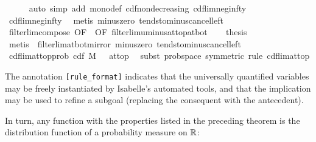 \documentclass[leqno]{article}
\theoremstyle{definition}
\begin{document}
\begin{isabellebody}
\ \ \ \ \isamarkupfalse%
\ {\isacharparenleft}auto\ simp\ add{\isacharcolon}\ mono{\isacharunderscore}def\ cdf{\isacharunderscore}nondecreasing\ cdf{\isacharunderscore}lim{\isacharunderscore}neg{\isacharunderscore}infty{\isacharparenright}\isanewline
\ \ \ \ \isamarkupfalse%
\ cdf{\isacharunderscore}lim{\isacharunderscore}neg{\isacharunderscore}infty\ \isamarkupfalse%
\ {\isacharparenleft}metis\ minus{\isacharunderscore}zero\ tendsto{\isacharunderscore}minus{\isacharunderscore}cancel{\isacharunderscore}left{\isacharparenright}\isanewline
\ \ \isamarkupfalse%
\ filterlim{\isacharunderscore}compose\ {\isacharbrackleft}OF\ {}{\isacharcomma}\ OF\ filterlim{\isacharunderscore}uminus{\isacharunderscore}at{\isacharunderscore}top{\isacharunderscore}at{\isacharunderscore}bot{\isacharbrackright}\isanewline
\ \ \isamarkupfalse%
\ {\isacharquery}thesis\isanewline
\ \ \ \ \isamarkupfalse%
\ {\isacharparenleft}metis\ {\isachardoublequoteopen}{}{\isachardoublequoteclose}\ filterlim{\isacharunderscore}at{\isacharunderscore}bot{\isacharunderscore}mirror\ minus{\isacharunderscore}zero\ tendsto{\isacharunderscore}minus{\isacharunderscore}cancel{\isacharunderscore}left{\isacharparenright}\isanewline
{}\isamarkupfalse%
\isanewline\isanewline%
\isamarkupfalse%
\ cdf{\isacharunderscore}lim{\isacharunderscore}at{\isacharunderscore}top{\isacharunderscore}prob{\isacharcolon}\ {\isachardoublequoteopen}{\isacharparenleft}cdf\ M\ {\isacharminus}{\isacharminus}{\isacharminus}{\isachargreater}\ {}{\isacharparenright}\ at{\isacharunderscore}top{\isachardoublequoteclose}\ \isanewline
{}\isamarkupfalse%
\ {\isacharparenleft}subst\ prob{\isacharunderscore}space\ {\isacharbrackleft}symmetric{\isacharbrackright}{\isacharcomma}\ rule\ cdf{\isacharunderscore}lim{\isacharunderscore}at{\isacharunderscore}top{\isacharparenright}%
\end{isabellebody}

\medskip

The annotation \texttt{[rule\_format]} indicates that the universally quantified variables may be freely instantiated by Isabelle's automated tools, and that the implication may be used to refine a subgoal (replacing the consequent with the antecedent). 

In turn, any function with the properties listed in the preceding theorem is the distribution function of a probability measure on $\mathbb{R}$:
\end{document}
